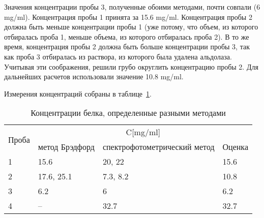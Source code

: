 Значения концентрации пробы 3, полученные обоими методами, почти совпали (6 mg/ml).
Концентрация пробы 1 принята за 15.6 mg/ml.
Концентрация пробы 2 должна быть меньше концентрации пробы 1
(уже потому, что объем, из которого отбиралась проба 1,
меньше объема, из которого отбиралась проба 2).
В то же время, концентрация пробы 2 должна быть больше концентрации пробы 3,
так как проба 3 отбиралась из раствора, из которого была удалена альдолаза.
Учитывая эти соображения, решили грубо округлить концентрацию пробы 2.
Для дальнейших расчетов использовали значение 10.8 mg/ml.

Измерения концентраций собраны в таблице~\ref{table-conc}.

\begin{table}[htbp]
\caption{Концентрации белка, определенные разными методами}
\begin{tabular}{|l|l|l|l|}
\hline
\multirow{2}{*}{Проба} & \multicolumn{3}{|c|}{C[mg/ml]} \\
\cline{2-4}
& метод Брэдфорд & спектрофотометрический метод & Оценка \\
\hline
1 & 15.6 & 20, 22 & 15.6 \\
\hline
2 & 17.6, 25.1 & 7.3, 8.2 & 10.8 \\
\hline
3 & 6.2 & 6 & 6.2 \\
\hline
4 & -- & 32.7 & 32.7 \\
\hline
\end{tabular}
\label{table-conc}
\end{table}

